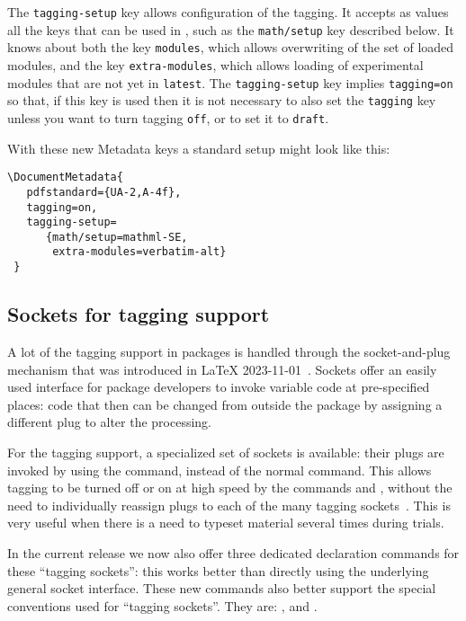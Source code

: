 \documentclass{ltnews}
\begin{document}
The \texttt{tagging-setup} key allows configuration of the tagging. It
accepts as values all the keys that can be used in ,
such as the \texttt{math/setup} key described below. It knows about
both the key \texttt{modules}, which allows overwriting of the set of
loaded modules, and the key \texttt{extra-modules}, which allows
loading of experimental modules that are not yet in \texttt{latest}.
%
The \texttt{tagging-setup} key implies \texttt{tagging=on} so that, if
this key is used then it is not necessary to also set the
\texttt{tagging} key unless you want to turn tagging \texttt{off}, or
to set it to \texttt{draft}.

With these new Metadata keys a standard setup might look like this:
\begin{verbatim}
\DocumentMetadata{
   pdfstandard={UA-2,A-4f},
   tagging=on,
   tagging-setup=
      {math/setup=mathml-SE,
       extra-modules=verbatim-alt}
 }      
\end{verbatim}


\subsection{Sockets for tagging support}

A lot of the tagging support in packages is handled through the
socket-and-plug mechanism that was introduced in \LaTeX{}
2023-11-01~\cite[p.\,93]{41:ltnews}.
%
Sockets offer an easily used interface for package developers to
invoke variable code at pre-specified places: code that then can be
changed from outside the package by assigning a different plug to
alter the processing.

For the tagging support, a specialized set of sockets is available:
their plugs are invoked by using the  command,
instead of the normal  command. This allows tagging to
be turned off or on at high speed by the commands 
and , without the need to individually reassign
plugs to each of the many tagging
sockets~\cite[p.\,97]{41:ltnews}. This is very useful when there is a
need to typeset material several times during trials.

In the current release we now also offer three dedicated declaration
commands for these \enquote{tagging sockets}: this works better than
directly using the underlying general socket interface.  These new
commands also better support the special conventions used for
\enquote{tagging sockets}. They are: ,
 and .
\end{document}
